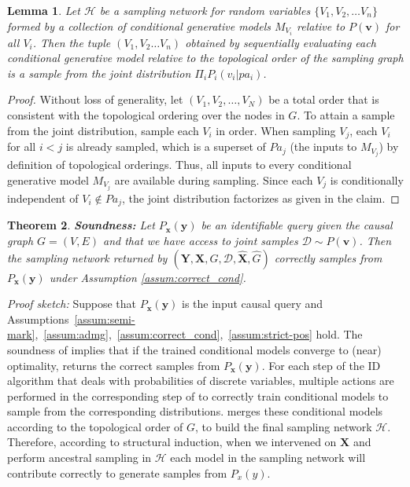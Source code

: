 \documentclass{article}
\newcommand{\h}{\mathcal{H}}
\newcommand{\x}{\mathbf{x}}
\newcommand{\y}{\mathbf{y}}
\newcommand{\X}{\mathbf{X}}
\newcommand{\Xp}{{\hat{\mathbf{X}}}}
\newcommand{\Gp}{{\hat{{G}}}}
\newcommand{\vb}{\mathbf{v}}
\newcommand{\data}{\mathcal{D}}
\newcommand{\idgen}{\text{ID-GEN}\xspace}
\newcommand{\idgenpar}{\idgen$(\mathbf{Y}, \mathbf{X},  G,  \data, {\Xp}, \Gp)$\xspace}
\theoremstyle{plain}
\newtheorem{theorem}{Theorem}[section]
\newtheorem{lemma}[theorem]{Lemma}
\theoremstyle{definition}
\theoremstyle{remark}
\begin{document}
\begin{lemma}
\label{lemma:joint-sample-from-net}
	Let $\h$ be a sampling network for random variables $\{V_1, V_2,\hdots V_n\}$ formed by a collection of conditional generative models $M_{V_i}$ relative to $P(\vb)$ for all $V_i$. Then the tuple $(V_1, V_2\hdots V_n)$ obtained by sequentially evaluating each conditional generative model relative to the topological order of the sampling graph is a sample from the joint distribution $\Pi_i P_i(v_i|pa_i)$.
\end{lemma}
\begin{proof}
	Without loss of generality, let $(V_1, V_2, \dots, V_N)$ be a total order that is consistent with the topological ordering over the nodes in $G$. To attain a sample from the joint distribution, sample each $V_i$ in order. When sampling $V_j$, each $V_i$ for all $i < j$ is already sampled, which is a superset of $Pa_j$ (the inputs to $M_{V_j}$) by definition of topological orderings. Thus, all inputs to every conditional generative model $M_{V_j}$ are available during sampling.  Since each $V_j$ is conditionally independent of $V_i\not \in Pa_j$, the joint distribution factorizes as given in the claim.
\end{proof}



\begin{figure}[omitted: a diagram of this paper's results, not reproduced here]\end{figure}

 

	
	\begin{theorem}
		\label{th:id-dag-Soundness}
		\textbf{\idgen Soundness:} Let $P_{\x}(\y)$ be an identifiable query given the causal graph $G=(V, E)$ and that we have access to joint samples $\data\sim P(\vb)$. Then the sampling network returned by \idgenpar
		correctly samples from $P_{\x}(\y)$ under Assumption \ref{assum:correct_cond}.
	\end{theorem}
	
\emph{Proof sketch:}
Suppose that $P_{\x}(\y)$ is the input causal query and Assumptions~\ref{assum:semi-mark},~\ref{assum:admg},~\ref{assum:correct_cond},~\ref{assum:strict-pos} hold.
The soundness of \idgen implies that if the trained conditional models converge to (near) optimality, \idgen returns the correct samples from $P_{\x}(\y)$. For each step of the ID algorithm that deals with probabilities of discrete variables,  multiple actions are performed in the corresponding step of \idgen to correctly train conditional models to sample from the corresponding distributions. 
\idgen merges these conditional models according to the topological order of $G$, to build the final sampling network $\h$.
Therefore, according to structural induction, when we intervened on $\X$ and perform ancestral sampling in $\h$  each model in the sampling network will contribute correctly to generate samples from $P_{{x}}({y})$.
  
\end{document}
